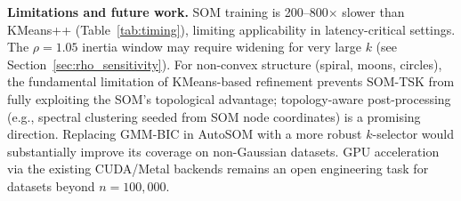 \documentclass[journal]{IEEEtran}
\begin{document}
\textbf{Limitations and future work.} SOM training is 200--800$\times$ slower than KMeans++ (Table~\ref{tab:timing}), limiting applicability in latency-critical settings. The $\rho=1.05$ inertia window may require widening for very large $k$ (see Section~\ref{sec:rho_sensitivity}). For non-convex structure (spiral, moons, circles), the fundamental limitation of KMeans-based refinement prevents SOM-TSK from fully exploiting the SOM's topological advantage; topology-aware post-processing (e.g., spectral clustering seeded from SOM node coordinates) is a promising direction. Replacing GMM-BIC in AutoSOM with a more robust $k$-selector would substantially improve its coverage on non-Gaussian datasets. GPU acceleration via the existing CUDA/Metal backends remains an open engineering task for datasets beyond $n=100{,}000$.
\end{document}
